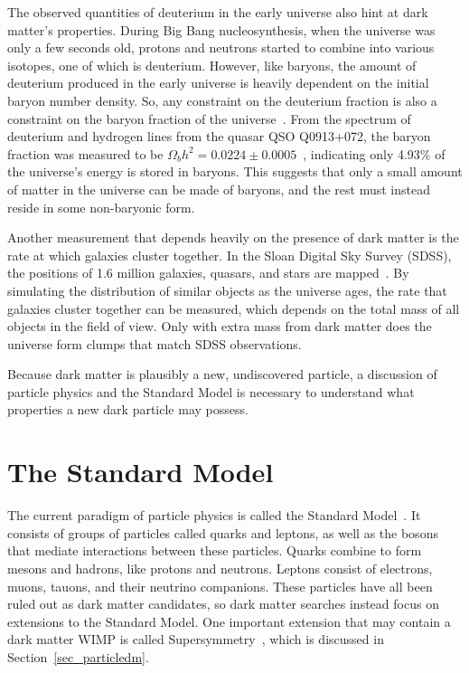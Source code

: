 The observed quantities of deuterium in the early universe also hint at dark matter's properties.
During Big Bang nucleosynthesis, when the universe was only a few seconds old, protons and neutrons started to combine into various isotopes, one of which is deuterium.
However, like baryons, the amount of deuterium produced in the early universe is heavily dependent on the initial baryon number density.
So, any constraint on the deuterium fraction is also a constraint on the baryon fraction of the universe~\cite{deuterium1,deuterium2}.
From the spectrum of deuterium and hydrogen lines from the quasar QSO Q0913+072, the baryon fraction was measured to be $\Omega_{b}h^2 = 0.0224 \pm 0.0005$~\cite{deuterium3}, indicating only 4.93\% of the universe's energy is stored in baryons.
This suggests that only a small amount of matter in the universe can be made of baryons, and the rest must instead reside in some non-baryonic form.

Another measurement that depends heavily on the presence of dark matter is the rate at which galaxies cluster together.
In the Sloan Digital Sky Survey (SDSS), the positions of 1.6 million galaxies, quasars, and stars are mapped~\cite{sdss_release}.
By simulating the distribution of similar objects as the universe ages, the rate that galaxies cluster together can be measured, which depends on the total mass of all objects in the field of view.
Only with extra mass from dark matter does the universe form clumps that match SDSS observations.

Because dark matter is plausibly a new, undiscovered particle, a discussion of particle physics and the Standard Model is necessary to understand what properties a new dark particle may possess.

\section{The Standard Model}

The current paradigm of particle physics is called the Standard Model~\cite{standardmodel}.
It consists of groups of particles called quarks and leptons, as well as the bosons that mediate interactions between these particles.
Quarks combine to form mesons and hadrons, like protons and neutrons.
Leptons consist of electrons, muons, tauons, and their neutrino companions.
These particles have all been ruled out as dark matter candidates, so dark matter searches instead focus on extensions to the Standard Model.
One important extension that may contain a dark matter WIMP is called Supersymmetry~\cite{Jungman:1995df}, which is discussed in Section~\ref{sec_particledm}.

